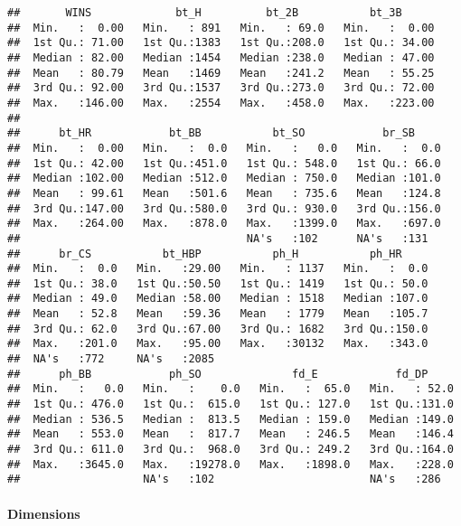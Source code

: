 \documentclass[]{article}
\let\oldparagraph\paragraph
\renewcommand{\paragraph}[1]{\oldparagraph{#1}\mbox{}}
\begin{document}
\begin{verbatim}
##       WINS             bt_H          bt_2B           bt_3B       
##  Min.   :  0.00   Min.   : 891   Min.   : 69.0   Min.   :  0.00  
##  1st Qu.: 71.00   1st Qu.:1383   1st Qu.:208.0   1st Qu.: 34.00  
##  Median : 82.00   Median :1454   Median :238.0   Median : 47.00  
##  Mean   : 80.79   Mean   :1469   Mean   :241.2   Mean   : 55.25  
##  3rd Qu.: 92.00   3rd Qu.:1537   3rd Qu.:273.0   3rd Qu.: 72.00  
##  Max.   :146.00   Max.   :2554   Max.   :458.0   Max.   :223.00  
##                                                                  
##      bt_HR            bt_BB           bt_SO            br_SB      
##  Min.   :  0.00   Min.   :  0.0   Min.   :   0.0   Min.   :  0.0  
##  1st Qu.: 42.00   1st Qu.:451.0   1st Qu.: 548.0   1st Qu.: 66.0  
##  Median :102.00   Median :512.0   Median : 750.0   Median :101.0  
##  Mean   : 99.61   Mean   :501.6   Mean   : 735.6   Mean   :124.8  
##  3rd Qu.:147.00   3rd Qu.:580.0   3rd Qu.: 930.0   3rd Qu.:156.0  
##  Max.   :264.00   Max.   :878.0   Max.   :1399.0   Max.   :697.0  
##                                   NA's   :102      NA's   :131    
##      br_CS           bt_HBP           ph_H           ph_HR      
##  Min.   :  0.0   Min.   :29.00   Min.   : 1137   Min.   :  0.0  
##  1st Qu.: 38.0   1st Qu.:50.50   1st Qu.: 1419   1st Qu.: 50.0  
##  Median : 49.0   Median :58.00   Median : 1518   Median :107.0  
##  Mean   : 52.8   Mean   :59.36   Mean   : 1779   Mean   :105.7  
##  3rd Qu.: 62.0   3rd Qu.:67.00   3rd Qu.: 1682   3rd Qu.:150.0  
##  Max.   :201.0   Max.   :95.00   Max.   :30132   Max.   :343.0  
##  NA's   :772     NA's   :2085                                   
##      ph_BB            ph_SO              fd_E            fd_DP      
##  Min.   :   0.0   Min.   :    0.0   Min.   :  65.0   Min.   : 52.0  
##  1st Qu.: 476.0   1st Qu.:  615.0   1st Qu.: 127.0   1st Qu.:131.0  
##  Median : 536.5   Median :  813.5   Median : 159.0   Median :149.0  
##  Mean   : 553.0   Mean   :  817.7   Mean   : 246.5   Mean   :146.4  
##  3rd Qu.: 611.0   3rd Qu.:  968.0   3rd Qu.: 249.2   3rd Qu.:164.0  
##  Max.   :3645.0   Max.   :19278.0   Max.   :1898.0   Max.   :228.0  
##                   NA's   :102                        NA's   :286
\end{verbatim}

\hypertarget{dimensions}{%
\paragraph{Dimensions}\label{dimensions}}
\end{document}

